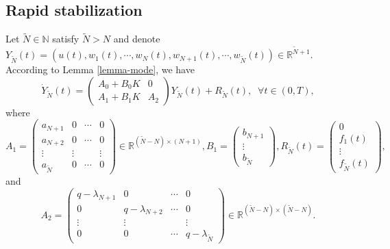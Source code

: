 \documentclass[review]{elsarticle}
\numberwithin{equation}{section}
\begin{document}
\subsection{Rapid stabilization}
Let $\tilde{N}\in \mathbb{N}$ satisfy $\tilde{N}> N$ and denote $Y_{\tilde{N}}(t)=(u(t),w_1(t) ,\cdots ,w_N(t),w_{{N+1}}(t),\cdots ,w_{\tilde{N}}(t))\in \mathbb{R}^{\tilde{N}+1}$. According to Lemma \ref{lemma-mode}, we have
\begin{equation*}
    \label{TITLEN}
    \dot{Y}_{\tilde{N}}(t)=\left(\begin{array}{cc}
A_0+B_0 K & 0 \\
A_1+B_1K & A_2
\end{array}\right)Y_{\tilde{N}}(t)+R_{\tilde{N}}(t),\;\; \forall t\in (0,T),
\end{equation*}
where $$A_1=\left(\begin{array}{cccc}
a_{N+1} & 0 & \cdots&0 \\
a_{N+2} & 0&\cdots& 0 \\
\vdots & \vdots  && \vdots \\
a_{\tilde{N}} & 0 & \cdots&0 
\end{array}\right)\in \mathbb{R}^{(\tilde{N}-N)\times(N+1)},B_1=\left(\begin{array}{c}
b_{N+1} \\
\vdots \\
b_{\tilde{N}}
\end{array}\right),R_{\tilde{N}}(t)=\left(\begin{array}{c}
0\\
f_1(t) \\
\vdots \\
f_{\tilde{N}}(t)
\end{array}\right),$$
 and $$A_2=\left(\begin{array}{cccc}
q-\lambda_{N+1} & 0 & \cdots&0 \\
0 & q-\lambda_{N+2}&\cdots& 0 \\
\vdots & \vdots  &&\vdots \\
0 & 0 & \cdots&q-\lambda_{\tilde{N}}
\end{array}\right)\in \mathbb{R}^{(\tilde{N}-N)\times(\tilde{N}-N)}.$$
\end{document}
